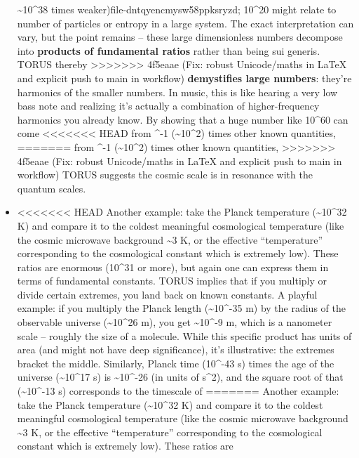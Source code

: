 \documentclass[]{article}
\begin{document}
\begin{itemize}
  \textasciitilde{}10\^{}38 times weaker)​file-dntqyencmysw58ppksryzd;
  10\^{}20 might relate to number of particles or entropy in a large
  system. The exact interpretation can vary, but the point remains --
  these large dimensionless numbers decompose into \textbf{products of
  fundamental ratios} rather than being sui generis. TORUS thereby
>>>>>>> 4f5eaae (Fix: robust Unicode/maths in LaTeX and explicit push to main in workflow)
  \textbf{demystifies large numbers}: they're harmonics of the smaller
  numbers. In music, this is like hearing a very low bass note and
  realizing it's actually a combination of higher-frequency harmonics
  you already know. By showing that a huge number like 10\^{}60 can come
<<<<<<< HEAD
  from \alpha\^{}-1 (\textasciitilde10\^{}2) times other known quantities,
=======
  from \alpha\^{}-1 (\textasciitilde{}10\^{}2) times other known quantities,
>>>>>>> 4f5eaae (Fix: robust Unicode/maths in LaTeX and explicit push to main in workflow)
  TORUS suggests the cosmic scale is in resonance with the quantum
  scales​.
\item
<<<<<<< HEAD
  Another example: take the Planck temperature (\textasciitilde10\^{}32
  K) and compare it to the coldest meaningful cosmological temperature
  (like the cosmic microwave background \textasciitilde3 K, or the
  effective ``temperature'' corresponding to the cosmological constant
  which is extremely low). These ratios are enormous (10\^{}31 or more),
  but again one can express them in terms of fundamental constants.
  TORUS implies that if you multiply or divide certain extremes, you
  land back on known constants. A playful example: if you multiply the
  Planck length (\textasciitilde10\^{}-35 m) by the radius of the
  observable universe (\textasciitilde10\^{}26 m), you get
  \textasciitilde10\^{}-9 m, which is a nanometer scale -- roughly the
  size of a molecule. While this specific product has units of area (and
  might not have deep significance), it's illustrative: the extremes
  bracket the middle. Similarly, Planck time (10\^{}-43 s) times the age
  of the universe (\textasciitilde10\^{}17 s) is
  \textasciitilde10\^{}-26 (in units of s\^{}2), and the square root of
  that (\textasciitilde10\^{}-13 s) corresponds to the timescale of
=======
  Another example: take the Planck temperature
  (\textasciitilde{}10\^{}32 K) and compare it to the coldest meaningful
  cosmological temperature (like the cosmic microwave background
  \textasciitilde{}3 K, or the effective ``temperature'' corresponding
  to the cosmological constant which is extremely low). These ratios are

\end{itemize}
\end{document}
